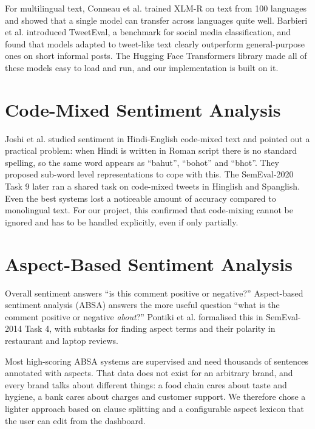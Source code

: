 \documentclass[12pt,a4paper]{report}
\begin{document}
For multilingual text, Conneau et al. \cite{conneau2020} trained XLM-R on text from 100 languages and showed that a single model can transfer across languages quite well. Barbieri et al. \cite{barbieri2020} introduced TweetEval, a benchmark for social media classification, and found that models adapted to tweet-like text clearly outperform general-purpose ones on short informal posts. The Hugging Face Transformers library \cite{wolf2020} made all of these models easy to load and run, and our implementation is built on it.

\section{Code-Mixed Sentiment Analysis}

Joshi et al. \cite{joshi2016} studied sentiment in Hindi-English code-mixed text and pointed out a practical problem: when Hindi is written in Roman script there is no standard spelling, so the same word appears as ``bahut'', ``bohot'' and ``bhot''. They proposed sub-word level representations to cope with this. The SemEval-2020 Task 9 \cite{patwa2020} later ran a shared task on code-mixed tweets in Hinglish and Spanglish. Even the best systems lost a noticeable amount of accuracy compared to monolingual text. For our project, this confirmed that code-mixing cannot be ignored and has to be handled explicitly, even if only partially.

\section{Aspect-Based Sentiment Analysis}

Overall sentiment answers ``is this comment positive or negative?'' Aspect-based sentiment analysis (ABSA) answers the more useful question ``what is the comment positive or negative \textit{about}?'' Pontiki et al. \cite{pontiki2014} formalised this in SemEval-2014 Task 4, with subtasks for finding aspect terms and their polarity in restaurant and laptop reviews.

Most high-scoring ABSA systems are supervised and need thousands of sentences annotated with aspects. That data does not exist for an arbitrary brand, and every brand talks about different things: a food chain cares about taste and hygiene, a bank cares about charges and customer support. We therefore chose a lighter approach based on clause splitting and a configurable aspect lexicon that the user can edit from the dashboard.
\end{document}
